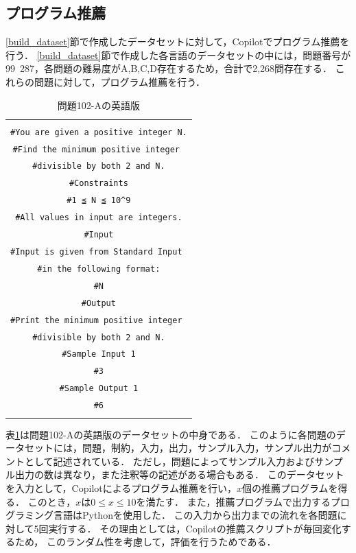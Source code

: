   \subsection{プログラム推薦\label{recommend_program}}
    \ref{build_dataset}節で作成したデータセットに対して，Copilotでプログラム推薦を行う．
    \ref{build_dataset}節で作成した各言語のデータセットの中には，問題番号が99~287，各問題の難易度がA,B,C,D存在するため，合計で2,268問存在する．
    これらの問題に対して，プログラム推薦を行う．
    
    \begin{table}[t]
      \caption{問題102-Aの英語版}
      \begin{tabular}{c}
        \begin{tabularx}{23zw}{X}
          \hline
          \verb|#Problem Statement| \\
          \verb|#You are given a positive integer N.| \\
          \verb|#Find the minimum positive integer | \\
          \verb|#divisible by both 2 and N.| \\
          \verb|#Constraints| \\
          \verb|#1 ≦ N ≦ 10^9| \\
          \verb|#All values in input are integers.| \\
          \verb|#Input| \\
          \verb|#Input is given from Standard Input | \\
          \verb|#in the following format:| \\
          \verb|#N| \\
          \verb|#Output| \\
          \verb|#Print the minimum positive integer | \\
          \verb|#divisible by both 2 and N.| \\
          \verb|#Sample Input 1| \\
          \verb|#3| \\
          \verb|#Sample Output 1| \\
          \verb|#6| \\
          \hline
        \end{tabularx}
      \end{tabular}
      \label{problem_102_A_en}
    \end{table}

    表\ref{problem_102_A_en}は問題102-Aの英語版のデータセットの中身である．
    このように各問題のデータセットには，問題，制約，入力，出力，サンプル入力，サンプル出力がコメントとして記述されている．
    ただし，問題によってサンプル入力およびサンプル出力の数は異なり，また注釈等の記述がある場合もある．
    このデータセットを入力として，Copilotによるプログラム推薦を行い，$x$個の推薦プログラムを得る．
    このとき，$x$は$0{\leq}x{\leq}10$を満たす．
    また，推薦プログラムで出力するプログラミング言語はPythonを使用した．
    この入力から出力までの流れを各問題に対して5回実行する．
    その理由としては，Copilotの推薦スクリプトが毎回変化するため，
    このランダム性を考慮して，評価を行うためである．
    
